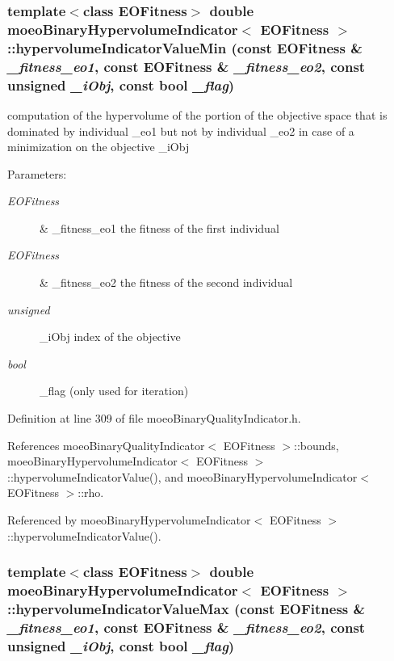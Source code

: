 \subsubsection{\setlength{\rightskip}{0pt plus 5cm}template$<$class EOFitness$>$ double {\bf moeo\-Binary\-Hypervolume\-Indicator}$<$ EOFitness $>$::hypervolume\-Indicator\-Value\-Min (const EOFitness \& {\em \_\-fitness\_\-eo1}, const EOFitness \& {\em \_\-fitness\_\-eo2}, const unsigned {\em \_\-i\-Obj}, const bool {\em \_\-flag})\hspace{0.3cm}{\tt  [inline, private]}}\label{classmoeoBinaryHypervolumeIndicator_637f559f83f473412c61d4a485af5993}


computation of the hypervolume of the portion of the objective space that is dominated by individual \_\-eo1 but not by individual \_\-eo2 in case of a minimization on the objective \_\-i\-Obj 

\begin{Desc}
\item[Parameters:]
\begin{description}
\item[{\em EOFitness}]\& \_\-fitness\_\-eo1 the fitness of the first individual \item[{\em EOFitness}]\& \_\-fitness\_\-eo2 the fitness of the second individual \item[{\em unsigned}]\_\-i\-Obj index of the objective \item[{\em bool}]\_\-flag (only used for iteration) \end{description}
\end{Desc}


Definition at line 309 of file moeo\-Binary\-Quality\-Indicator.h.

References moeo\-Binary\-Quality\-Indicator$<$ EOFitness $>$::bounds, moeo\-Binary\-Hypervolume\-Indicator$<$ EOFitness $>$::hypervolume\-Indicator\-Value(), and moeo\-Binary\-Hypervolume\-Indicator$<$ EOFitness $>$::rho.

Referenced by moeo\-Binary\-Hypervolume\-Indicator$<$ EOFitness $>$::hypervolume\-Indicator\-Value().
\subsubsection{\setlength{\rightskip}{0pt plus 5cm}template$<$class EOFitness$>$ double {\bf moeo\-Binary\-Hypervolume\-Indicator}$<$ EOFitness $>$::hypervolume\-Indicator\-Value\-Max (const EOFitness \& {\em \_\-fitness\_\-eo1}, const EOFitness \& {\em \_\-fitness\_\-eo2}, const unsigned {\em \_\-i\-Obj}, const bool {\em \_\-flag})\hspace{0.3cm}{\tt  [inline, private]}}\label{classmoeoBinaryHypervolumeIndicator_c0a602a4f1a27418d95d883f53e45cb2}



